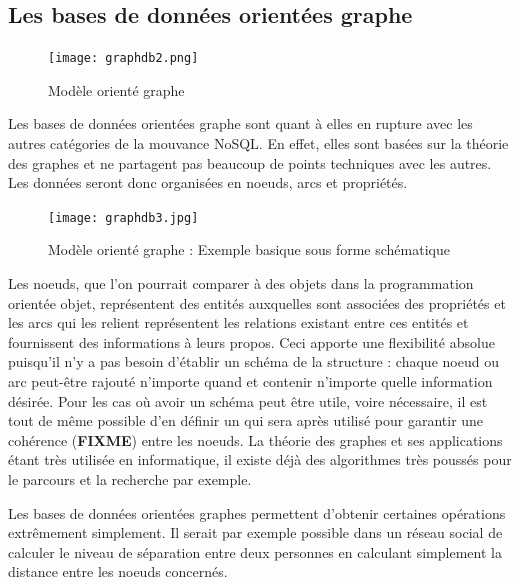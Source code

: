 \documentclass[11pt]{article}
\begin{document}
\subsection{Les bases de données orientées graphe} \label{sec:graph}
\begin{figure}[H]
  \centering
  \begin{center}
    \texttt{[image: graphdb2.png]}
  \end{center}
  \caption{Modèle orienté graphe\cite{neo4jwebsite}}
\end{figure}
Les bases de données orientées graphe sont quant à elles en rupture avec les autres catégories de la mouvance NoSQL. En effet, elles sont basées sur la théorie des graphes et ne partagent pas beaucoup de points techniques avec les autres. Les données seront donc organisées en noeuds, arcs et propriétés. \\
\begin{figure}[H]
  \centering
  \begin{center}
    \texttt{[image: graphdb3.jpg]}
  \end{center}
  \caption{Modèle orienté graphe : Exemple basique sous forme schématique\cite{toddhoffbuttox}}
\end{figure} 
Les noeuds, que l'on pourrait comparer à des objets dans la programmation orientée objet, représentent des entités auxquelles sont associées des propriétés et les arcs qui les relient représentent les relations existant entre ces entités et fournissent des informations à leurs propos. Ceci apporte une flexibilité absolue puisqu'il n'y a pas besoin d'établir un schéma de la structure : chaque noeud ou arc peut-être rajouté n'importe quand et contenir n'importe quelle information désirée. Pour les cas où avoir un schéma peut être utile, voire nécessaire, il est tout de même possible d'en définir un qui sera après utilisé pour garantir une cohérence (\colorbox{BrickRed}{\textbf{FIXME}}) entre les noeuds. La théorie des graphes et ses applications étant très utilisée en informatique, il existe déjà des algorithmes très poussés pour le parcours et la recherche par exemple.

Les bases de données orientées graphes permettent d'obtenir certaines opérations extrêmement simplement. Il serait par exemple possible dans un réseau social de calculer le niveau de séparation entre deux personnes en calculant simplement la distance entre les noeuds concernés.
\end{document}

